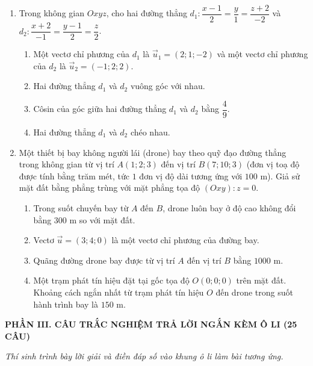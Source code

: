 \documentclass[12pt,a4paper]{article}
\begin{document}
\begin{enumerate}
\needspace{6.5cm}
\item Trong không gian $Oxyz$, cho hai đường thẳng $d_1: \dfrac{x-1}{2} = \dfrac{y}{1} = \dfrac{z+2}{-2}$ và $d_2: \dfrac{x+2}{-1} = \dfrac{y-1}{2} = \dfrac{z}{2}$.
\begin{enumerate}[label=\alph*),leftmargin=*,itemsep=3pt]
    \item Một vectơ chỉ phương của $d_1$ là $\vec{u}_1 = (2; 1; -2)$ và một vectơ chỉ phương của $d_2$ là $\vec{u}_2 = (-1; 2; 2)$.
    \item Hai đường thẳng $d_1$ và $d_2$ vuông góc với nhau.
    \item Côsin của góc giữa hai đường thẳng $d_1$ và $d_2$ bằng $\dfrac{4}{9}$.
    \item Hai đường thẳng $d_1$ và $d_2$ chéo nhau.
\end{enumerate}

\needspace{6.5cm}
\item Một thiết bị bay không người lái (drone) bay theo quỹ đạo đường thẳng trong không gian từ vị trí $A(1; 2; 3)$ đến vị trí $B(7; 10; 3)$ (đơn vị toạ độ được tính bằng trăm mét, tức $1$ đơn vị độ dài tương ứng với $100\text{ m}$). Giả sử mặt đất bằng phẳng trùng với mặt phẳng tọa độ $(Oxy): z = 0$.
\begin{enumerate}[label=\alph*),leftmargin=*,itemsep=3pt]
    \item Trong suốt chuyến bay từ $A$ đến $B$, drone luôn bay ở độ cao không đổi bằng $300\text{ m}$ so với mặt đất.
    \item Vectơ $\vec{u} = (3; 4; 0)$ là một vectơ chỉ phương của đường bay.
    \item Quãng đường drone bay được từ vị trí $A$ đến vị trí $B$ bằng $1000\text{ m}$.
    \item Một trạm phát tín hiệu đặt tại gốc tọa độ $O(0; 0; 0)$ trên mặt đất. Khoảng cách ngắn nhất từ trạm phát tín hiệu $O$ đến drone trong suốt hành trình bay là $150\text{ m}$.
\end{enumerate}
\end{enumerate}

\newpage
\begin{center}
    {\fontsize{13}{15}\selectfont\textbf{PHẦN III. CÂU TRẮC NGHIỆM TRẢ LỜI NGẮN KÈM Ô LI (25 CÂU)}}
\end{center}
\textit{Thí sinh trình bày lời giải và điền đáp số vào khung ô li làm bài tương ứng.}
\end{document}
